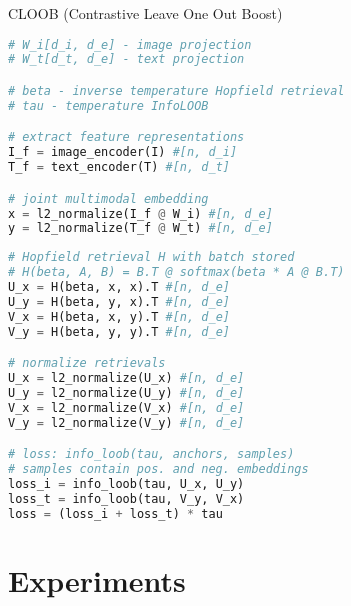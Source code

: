 \documentclass[utf8,aspectratio=169,ngerman,english,usenames,dvipsnames]{beamer}
\begin{document}
\begin{frame}[fragile]{CLOOB (Contrastive Leave One Out Boost)}
\begin{minipage}{0.8\textwidth}
\begin{onlyenv}
\begin{multicols}{2}
\begin{lstlisting}[language=Python, basicstyle=\tiny]
# W_i[d_i, d_e] - image projection
# W_t[d_t, d_e] - text projection

# beta - inverse temperature Hopfield retrieval
# tau - temperature InfoLOOB

# extract feature representations
I_f = image_encoder(I) #[n, d_i]
T_f = text_encoder(T) #[n, d_t]

# joint multimodal embedding
x = l2_normalize(I_f @ W_i) #[n, d_e]
y = l2_normalize(T_f @ W_t) #[n, d_e]\end{lstlisting}
                \columnbreak
                \begin{lstlisting}[language=Python, basicstyle=\tiny, firstnumber=last]
# Hopfield retrieval H with batch stored
# H(beta, A, B) = B.T @ softmax(beta * A @ B.T)
U_x = H(beta, x, x).T #[n, d_e]
U_y = H(beta, y, x).T #[n, d_e]
V_x = H(beta, x, y).T #[n, d_e]
V_y = H(beta, y, y).T #[n, d_e]

# normalize retrievals
U_x = l2_normalize(U_x) #[n, d_e] 
U_y = l2_normalize(U_y) #[n, d_e] 
V_x = l2_normalize(V_x) #[n, d_e] 
V_y = l2_normalize(V_y) #[n, d_e]

# loss: info_loob(tau, anchors, samples) 
# samples contain pos. and neg. embeddings 
loss_i = info_loob(tau, U_x, U_y)
loss_t = info_loob(tau, V_y, V_x)
loss = (loss_i + loss_t) * tau\end{lstlisting}
            \end{multicols}
        \end{onlyenv}
    \end{minipage}
    \hspace*{\fill}
\end{frame}

\section{Experiments}
\end{document}
